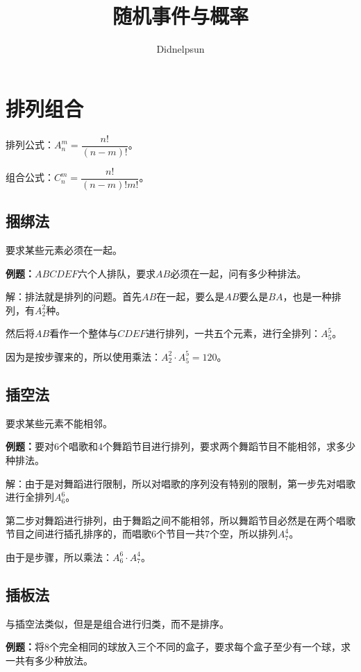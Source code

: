 \documentclass[UTF8, 12pt]{ctexart}
\author{Didnelpsun}
\title{随机事件与概率}
\date{}
\begin{document}
\maketitle
\pagestyle{empty}
\thispagestyle{empty}
\tableofcontents
\thispagestyle{empty}
\newpage
\pagestyle{plain}
\setcounter{page}{1}

\section{排列组合}

排列公式：$A_n^m=\dfrac{n!}{(n-m)!}$。

组合公式：$C_n^m=\dfrac{n!}{(n-m)!m!}$。

\subsection{捆绑法}

要求某些元素必须在一起。

\textbf{例题：}$ABCDEF$六个人排队，要求$AB$必须在一起，问有多少种排法。

解：排法就是排列的问题。首先$AB$在一起，要么是$AB$要么是$BA$，也是一种排列，有$A_2^2$种。

然后将$AB$看作一个整体与$CDEF$进行排列，一共五个元素，进行全排列：$A_5^5$。

因为是按步骤来的，所以使用乘法：$A_2^2\cdot A_5^5=120$。

\subsection{插空法}

要求某些元素不能相邻。

\textbf{例题：}要对6个唱歌和4个舞蹈节目进行排列，要求两个舞蹈节目不能相邻，求多少种排法。

解：由于是对舞蹈进行限制，所以对唱歌的序列没有特别的限制，第一步先对唱歌进行全排列$A_6^6$。

第二步对舞蹈进行排列，由于舞蹈之间不能相邻，所以舞蹈节目必然是在两个唱歌节目之间进行插孔排序的，而唱歌6个节目一共7个空，所以排列$A_7^4$。

由于是步骤，所以乘法：$A_6^6\cdot A_7^4$。

\subsection{插板法}

与插空法类似，但是是组合进行归类，而不是排序。

\textbf{例题：}将8个完全相同的球放入三个不同的盒子，要求每个盒子至少有一个球，求一共有多少种放法。
\end{document}
